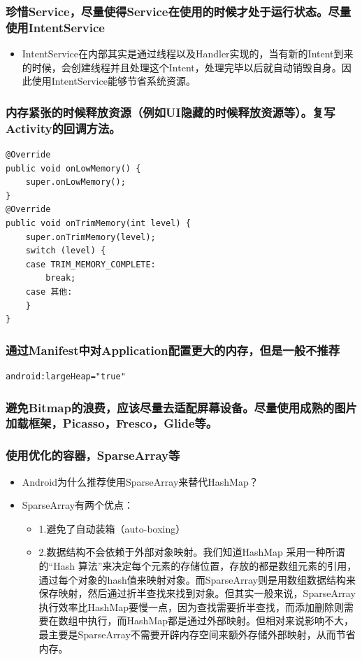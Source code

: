 \documentclass[9pt, b5paper]{article}
\begin{document}
\subsubsection{珍惜Service，尽量使得Service在使用的时候才处于运行状态。尽量使用IntentService}
\label{sec-1-1-1}
\begin{itemize}
\item IntentService在内部其实是通过线程以及Handler实现的，当有新的Intent到来的时候，会创建线程并且处理这个Intent，处理完毕以后就自动销毁自身。因此使用IntentService能够节省系统资源。
\end{itemize}
\subsubsection{内存紧张的时候释放资源（例如UI隐藏的时候释放资源等）。复写Activity的回调方法。}
\label{sec-1-1-2}
\begin{verbatim}
@Override 
public void onLowMemory() { 
    super.onLowMemory(); 
}  
@Override 
public void onTrimMemory(int level) { 
    super.onTrimMemory(level);  
    switch (level) { 
    case TRIM_MEMORY_COMPLETE: 
        break; 
    case 其他: 
    } 
}
\end{verbatim}
\subsubsection{通过Manifest中对Application配置更大的内存，但是一般不推荐}
\label{sec-1-1-3}
\begin{verbatim}
android:largeHeap="true"
\end{verbatim}
\subsubsection{避免Bitmap的浪费，应该尽量去适配屏幕设备。尽量使用成熟的图片加载框架，Picasso，Fresco，Glide等。}
\label{sec-1-1-4}
\subsubsection{使用优化的容器，SparseArray等}
\label{sec-1-1-5}
\begin{itemize}
\item Android为什么推荐使用SparseArray来替代HashMap？
\item SparseArray有两个优点：
\begin{itemize}
\item 1.避免了自动装箱（auto-boxing）
\item 2.数据结构不会依赖于外部对象映射。我们知道HashMap 采用一种所谓的“Hash 算法”来决定每个元素的存储位置，存放的都是数组元素的引用，通过每个对象的hash值来映射对象。而SparseArray则是用数组数据结构来保存映射，然后通过折半查找来找到对象。但其实一般来说，SparseArray执行效率比HashMap要慢一点，因为查找需要折半查找，而添加删除则需要在数组中执行，而HashMap都是通过外部映射。但相对来说影响不大，最主要是SparseArray不需要开辟内存空间来额外存储外部映射，从而节省内存。
\end{itemize}
\end{itemize}
\end{document}
